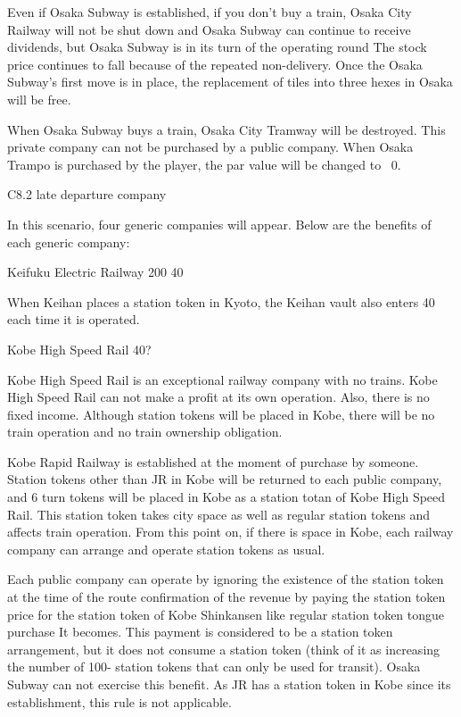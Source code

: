 \documentclass{article}
\begin{document}
\begin{CJK}{UTF8}{min}
Even if Osaka Subway is established, if you don't buy a train, Osaka City Railway will not be shut down and Osaka Subway can continue to receive dividends, but Osaka Subway is in its turn of the operating round The stock price continues to fall because of the repeated non-delivery. Once the Osaka Subway's first move is in place, the replacement of tiles into three hexes in Osaka will be free.

When Osaka Subway buys a train, Osaka City Tramway will be destroyed. This private company can not be purchased by a public company. When Osaka Trampo is purchased by the player, the par value will be changed to \ 0.

C8.2 late departure company

In this scenario, four generic companies will appear. Below are the benefits of each generic company:

Keifuku Electric Railway 200 40

When Keihan places a station token in Kyoto, the Keihan vault also enters 40 each time it is operated.

Kobe High Speed ​​Rail 40?

Kobe High Speed ​​Rail is an exceptional railway company with no trains. Kobe High Speed ​​Rail can not make a profit at its own operation. Also, there is no fixed income. Although station tokens will be placed in Kobe, there will be no train operation and no train ownership obligation.

Kobe Rapid Railway is established at the moment of purchase by someone. Station tokens other than JR in Kobe will be returned to each public company, and 6 turn tokens will be placed in Kobe as a station totan of Kobe High Speed ​​Rail. This station token takes city space as well as regular station tokens and affects train operation. From this point on, if there is space in Kobe, each railway company can arrange and operate station tokens as usual.

Each public company can operate by ignoring the existence of the station token at the time of the route confirmation of the revenue by paying the station token price for the station token of Kobe Shinkansen like regular station token tongue purchase It becomes. This payment is considered to be a station token arrangement, but it does not consume a station token (think of it as increasing the number of 100- station tokens that can only be used for transit). Osaka Subway can not exercise this benefit. As JR has a station token in Kobe since its establishment, this rule is not applicable.


\end{CJK}
\end{document}

